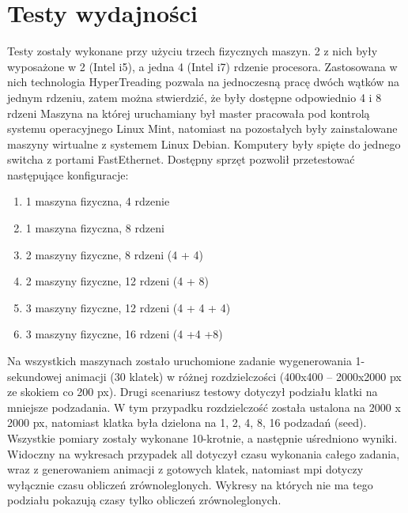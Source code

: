 \documentclass[a4paper]{article}
\begin{document}
\section{Testy wydajności}
Testy zostały wykonane przy użyciu trzech fizycznych maszyn. 2 z nich były wyposażone w 2 (Intel i5), a jedna 4 (Intel i7) rdzenie procesora. Zastosowana w nich technologia HyperTreading pozwala na jednoczesną pracę dwóch wątków na jednym rdzeniu, zatem można stwierdzić, że były dostępne odpowiednio 4 i 8 rdzeni Maszyna na której uruchamiany był master pracowała pod kontrolą systemu operacyjnego Linux Mint, natomiast na pozostałych były zainstalowane maszyny wirtualne z systemem Linux Debian. Komputery były spięte do jednego switcha z portami FastEthernet. Dostępny sprzęt pozwolił przetestować następujące konfiguracje:
\begin{enumerate}
\item 1 maszyna fizyczna, 4 rdzenie
\item 1 maszyna fizyczna, 8 rdzeni
\item 2 maszyny fizyczne, 8 rdzeni (4 + 4)
\item 2 maszyny fizyczne, 12 rdzeni (4 + 8)
\item 3 maszyny fizyczne, 12 rdzeni (4 + 4 + 4)
\item 3 maszyny fizyczne, 16 rdzeni (4 +4 +8)
\end{enumerate}

Na wszystkich maszynach zostało uruchomione zadanie wygenerowania 1-sekundowej animacji (30 klatek) w różnej rozdzielczości (400x400 – 2000x2000 px ze skokiem co 200 px). Drugi scenariusz testowy dotyczył podziału klatki na mniejsze podzadania. W tym przypadku rozdzielczość została ustalona na 2000 x 2000 px, natomiast klatka była dzielona na 1, 2, 4, 8, 16 podzadań (seed). Wszystkie pomiary zostały wykonane 10-krotnie, a następnie uśredniono wyniki. Widoczny na wykresach przypadek all dotyczył czasu wykonania całego zadania, wraz z generowaniem animacji z gotowych klatek, natomiast mpi dotyczy wyłącznie czasu obliczeń zrównoleglonych. Wykresy na których nie ma tego podziału pokazują czasy tylko obliczeń zrównoleglonych.
\end{document}
